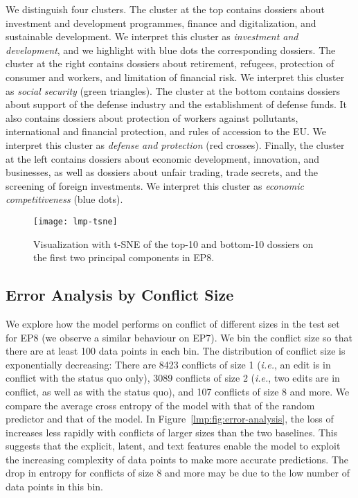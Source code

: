 We distinguish four clusters.
The cluster at the top contains dossiers about investment and development programmes, finance and digitalization, and sustainable development.
We interpret this cluster as \textit{investment and development}, and we highlight with blue dots the corresponding dossiers.
The cluster at the right contains dossiers about retirement, refugees, protection of consumer and workers, and limitation of financial risk.
We interpret this cluster as \textit{social security} (green triangles).
The cluster at the bottom contains dossiers about support of the defense industry and the establishment of defense funds.
It also contains dossiers about protection of workers against pollutants, international and financial protection, and rules of accession to the EU.
We interpret this cluster as \textit{defense and protection} (red crosses).
Finally, the cluster at the left contains dossiers about economic development, innovation, and businesses, as well as dossiers about unfair trading, trade secrets, and the screening of foreign investments.
We interpret this cluster as \textit{economic competitiveness} (blue dots).

\begin{figure}
  \centering
  \texttt{[image: lmp-tsne]}
	\caption{Visualization with t-SNE of the top-10 and bottom-10 dossiers on the first two principal components in EP8.}
	\label{lmp:fig:tsne}
\end{figure}

\subsection{Error Analysis by Conflict Size}

We explore how the  model performs on conflict of different sizes in the test set for EP8 (we observe a similar behaviour on EP7).
We bin the conflict size so that there are at least 100 data points in each bin.
The distribution of conflict size is exponentially decreasing:
There are 8423 conflicts of size 1 (\textit{i.e.}, an edit is in conflict with the status quo only), 3089 conflicts of size 2 (\textit{i.e.}, two edits are in conflict, as well as with the status quo),  and 107 conflicts of size 8 and more.
We compare the average cross entropy of the  model with that of the random predictor and that of the \wow{} model.
In Figure~\ref{lmp:fig:error-analysis}, the loss of  increases less rapidly with conflicts of larger sizes than the two baselines.
This suggests that the explicit, latent, and text features enable the model to exploit the increasing complexity of data points to make more accurate predictions.
The drop in entropy for conflicts of size 8 and more may be due to the low number of data points in this bin.

